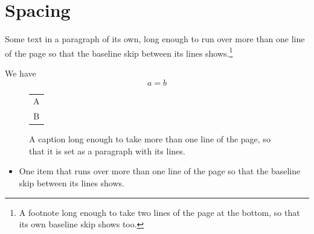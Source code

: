 \documentclass{report}
\begin{document}
\chapter{Spacing}
Some text in a paragraph of its own, long enough to run over more than one line of the page so that the
baseline skip between its lines shows.\footnote{A footnote long enough to take two lines of the page at the bottom, so that its own baseline skip shows too.}

We have
\begin{equation}
a = b
\end{equation}
\begin{figure}[h]
\centering
\begin{tabular}{c}A\\B\end{tabular}
\caption{A caption long enough to take more than one line of the page, so that it is set as a paragraph with its lines.}
\end{figure}
\begin{itemize}
\item One item that runs over more than one line of the page so that the baseline skip between its lines shows.
\end{itemize}
\end{document}
